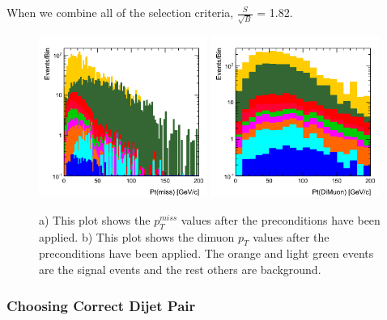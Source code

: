 \documentclass[12pt]{article}
\begin{document}
When we combine all of the selection criteria, $\frac{S}{\sqrt{B}} $ = 1.82.
\begin{figure}[!hbtp]
\begin{center}
    \includegraphics[width=0.49\textwidth]{images/Hist_PtMiss.png}
    \includegraphics[width=0.49\textwidth]{images/Hist_DiMuonPt.png}
    \caption{ \label{fig:ptmiss}
         a) This plot shows the $p^{miss}_{T}$ values after the preconditions have been applied. b) This plot shows the dimuon $p_{T}$ values 
	 after the preconditions have been applied. The orange and light green events are the signal events and the rest others are background.
      }
\end{center}
\end{figure} 


\subsubsection{Choosing Correct Dijet Pair}
\end{document}
